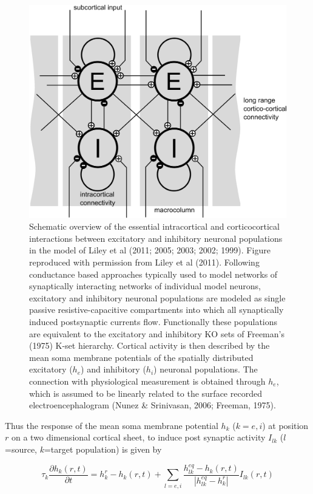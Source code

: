 \documentclass[a4paper,12pt]{article}
\begin{document}
\begin{figure}
\label{fig:liley_schema}
		\includegraphics[scale=0.15]{chosen-frontiers-2012/liley_topology.pdf}
		\caption{Schematic overview of the essential intracortical and corticocortical
interactions between excitatory and inhibitory neuronal
populations in the model of Liley et al (2011; 2005; 2003; 2002;
1999). Figure reproduced with permission from Liley et al (2011).
Following conductance based approaches typically used to model
networks of synaptically interacting networks of individual model
neurons, excitatory and inhibitory neuronal populations are modeled as
single passive resistive-capacitive compartments into which all
synaptically induced postsynaptic currents flow. Functionally these
populations are equivalent to the excitatory and inhibitory KO sets of
Freeman’s (1975) K-set hierarchy. Cortical activity is then described
by the mean soma membrane potentials of the spatially distributed excitatory ($h_e$)
and inhibitory ($h_i$) neuronal populations. The connection with physiological measurement is obtained through $h_e$,
which is
assumed to be linearly related to the surface recorded
electroencephalogram (Nunez \& Srinivasan, 2006; Freeman, 1975).}
\end{figure}

Thus the response of the mean soma membrane potential $h_k$ ($k=e,i$) at position $r$ on a two dimensional cortical
sheet, to induce post synaptic activity $I_{lk}$ ($l$=source, $k$=target population) is given by

\begin{equation} \label{eq:h_k} 
\tau_k\frac{\partial h_k(r,t)}{\partial t} = h^r_k - h_k(r,t) + \sum_{l=e,i} \frac{h_{lk}^{eq} - h_k(r, t)}{\left|
h_{lk}^{eq}-h_k^r\right|}I_{lk}(r,t)
\end{equation}
\end{document}
